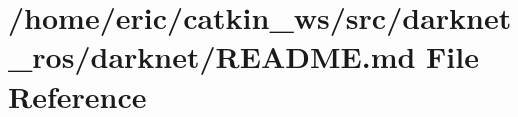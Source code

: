 \hypertarget{darknet__ros_2darknet_2README_8md}{}\section{/home/eric/catkin\+\_\+ws/src/darknet\+\_\+ros/darknet/\+R\+E\+A\+D\+ME.md File Reference}
\label{darknet__ros_2darknet_2README_8md}
